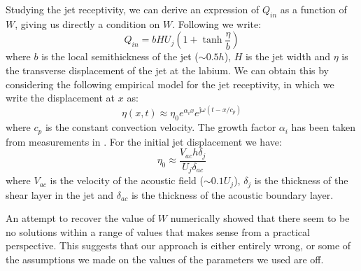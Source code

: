 \documentclass[a4paper]{article}
\begin{document}
Studying the jet receptivity, we can derive an expression of $Q_{in}$ as a function of $W$, giving us directly a condition on $W$. Following \cite{cuadra} we write:
$$ Q_{in} = bHU_j \left(1 + \tanh{\frac{\eta}{b}}\right) $$
where $b$ is the local semithickness of the jet ($\sim 0.5 h$), $H$ is the jet width and $\eta$ is the transverse displacement of the jet at the labium. We can obtain this by considering the following empirical model for the jet receptivity, in which we write the displacement at $x$ as:
$$ \eta(x, t) \approx \eta_0 e^{\alpha_i x}e^{\mathrm{j}\omega (t - x/c_p)} $$
where $c_p$ is the constant convection velocity. The growth factor $\alpha_i$ has been taken from measurements in \cite{cuadra}. For the initial jet displacement we have:
$$ \eta_0 \approx \frac{V_{ac}h\delta_j}{U_j\delta_{ac}} $$
where $V_{ac}$ is the velocity of the acoustic field ($\sim 0.1U_j$), $\delta_j$ is the thickness of the shear layer in the jet and $\delta_{ac}$ is the thickness of the acoustic boundary layer.

An attempt to recover the value of $W$ numerically showed that there seem to be no solutions within a range of values that makes sense from a practical perspective. This suggests that our approach is either entirely wrong, or some of the assumptions we made on the values of the parameters we used are off.

\printbibliography
\end{document}
